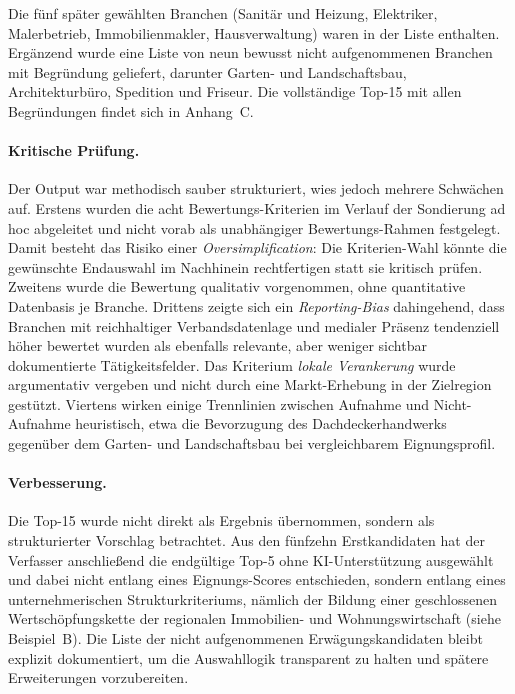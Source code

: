 \documentclass[a4paper,11pt]{article}
\begin{document}
Die fünf später gewählten Branchen (Sanitär und Heizung, Elektriker,
Malerbetrieb, Immobilienmakler, Hausverwaltung) waren in der Liste
enthalten. Ergänzend wurde eine Liste von neun bewusst nicht
aufgenommenen Branchen mit Begründung geliefert, darunter Garten- und
Landschaftsbau, Architekturbüro, Spedition und Friseur. Die
vollständige Top-15 mit allen Begründungen findet sich in Anhang~C.

\paragraph{Kritische Prüfung.}
Der Output war methodisch sauber strukturiert, wies jedoch mehrere
Schwächen auf. Erstens wurden die acht Bewertungs-Kriterien im Verlauf
der Sondierung ad hoc abgeleitet und nicht vorab als unabhängiger
Bewertungs-Rahmen festgelegt. Damit besteht das Risiko einer
\emph{Oversimplification}: Die Kriterien-Wahl könnte die gewünschte
Endauswahl im Nachhinein rechtfertigen statt sie kritisch prüfen.
Zweitens wurde die Bewertung qualitativ vorgenommen, ohne quantitative
Datenbasis je Branche. Drittens zeigte sich ein \emph{Reporting-Bias}
dahingehend, dass Branchen mit reichhaltiger Verbandsdatenlage und
medialer Präsenz tendenziell höher bewertet wurden als ebenfalls
relevante, aber weniger sichtbar dokumentierte Tätigkeitsfelder. Das
Kriterium \emph{lokale Verankerung} wurde argumentativ vergeben und
nicht durch eine Markt-Erhebung in der Zielregion gestützt. Viertens
wirken einige Trennlinien zwischen Aufnahme und Nicht-Aufnahme
heuristisch, etwa die Bevorzugung des Dachdecker\-handwerks gegenüber
dem Garten- und Landschaftsbau bei vergleichbarem Eignungsprofil.

\paragraph{Verbesserung.}
Die Top-15 wurde nicht direkt als Ergebnis übernommen, sondern als
strukturierter Vorschlag betrachtet. Aus den fünfzehn Erstkandidaten
hat der Verfasser anschließend die endgültige Top-5 ohne KI-Unterstützung
ausgewählt und dabei nicht entlang eines Eignungs-Scores entschieden,
sondern entlang eines unternehmerischen Strukturkriteriums, nämlich
der Bildung einer geschlossenen Wertschöpfungskette der regionalen
Immobilien- und Wohnungswirtschaft (siehe Beispiel~B). Die Liste der
nicht aufgenommenen Erwägungskandidaten bleibt explizit dokumentiert,
um die Auswahllogik transparent zu halten und spätere Erweiterungen
vorzubereiten.
\end{document}
